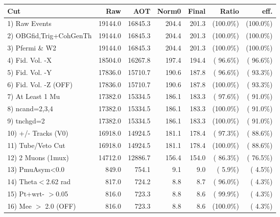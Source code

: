  \begin{table}[h!]\centering
 \begin{tabular}{||l||r|r|r|r|r|r||}
 \hline
 \hline
 Cut & Raw & AOT & Norm0 & Final & Ratio & eff.       \\
 \hline
  1) Raw Events           &      19144.0 &      16845.3 &        204.4 &        201.3 & (100.0\%) & (100.0\%) \\
  2) OBGfid,Trig+CohGenTh &      19144.0 &      16845.3 &        204.4 &        201.3 & (100.0\%) & (100.0\%) \\
  3) Pfermi \& W2         &      19144.0 &      16845.3 &        204.4 &        201.3 & (100.0\%) & (100.0\%) \\
  4) Fid. Vol. -X         &      18504.0 &      16267.8 &        197.4 &        194.4 & ( 96.6\%) & ( 96.6\%) \\
  5) Fid. Vol. -Y         &      17836.0 &      15710.7 &        190.6 &        187.8 & ( 96.6\%) & ( 93.3\%) \\
  6) Fid. Vol. -Z (OFF)   &      17836.0 &      15710.7 &        190.6 &        187.8 & (100.0\%) & ( 93.3\%) \\
  7) At Least 1 Mu        &      17382.0 &      15334.5 &        186.1 &        183.3 & ( 97.6\%) & ( 91.0\%) \\
  8) ncand=2,3,4          &      17382.0 &      15334.5 &        186.1 &        183.3 & (100.0\%) & ( 91.0\%) \\
  9) tnchgd=2             &      17382.0 &      15334.5 &        186.1 &        183.3 & (100.0\%) & ( 91.0\%) \\
 10) +/- Tracks (V0)      &      16918.0 &      14924.5 &        181.1 &        178.4 & ( 97.3\%) & ( 88.6\%) \\
 11) Tube/Veto Cut        &      16918.0 &      14924.5 &        181.1 &        178.4 & (100.0\%) & ( 88.6\%) \\
 12) 2 Muons (1mux)       &      14712.0 &      12886.7 &        156.4 &        154.0 & ( 86.3\%) & ( 76.5\%) \\
 13) PmuAsym<0.0          &        849.0 &        754.1 &          9.1 &          9.0 & (  5.9\%) & (  4.5\%) \\
 14) Theta$<$2.62 rad     &        817.0 &        724.2 &          8.8 &          8.7 & ( 96.0\%) & (  4.3\%) \\
 15) Pt+wrt- $>$0.05      &        816.0 &        723.3 &          8.8 &          8.6 & ( 99.9\%) & (  4.3\%) \\
 16) Mee $>$ 2.0  (OFF)   &        816.0 &        723.3 &          8.8 &          8.6 & (100.0\%) & (  4.3\%) \\

\end{tabular}
\end{table}

